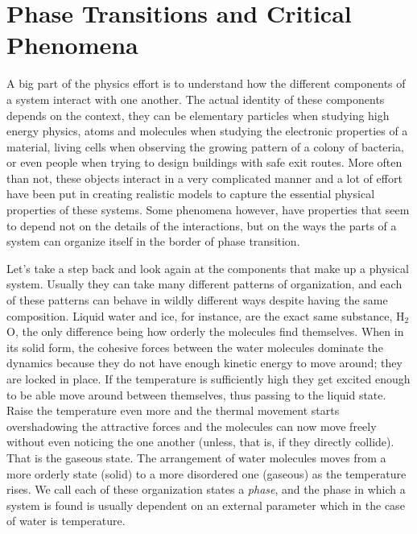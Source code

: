 \chapter{Phase Transitions and Critical Phenomena}
\label{ch2-crit}



A big part of the physics effort is to understand how the different components
of a system interact with one another. The actual identity of these components
depends on the context, they can be elementary particles when studying high
energy physics, atoms and molecules when studying the electronic properties of
a material, living cells when observing the growing pattern of a colony of
bacteria, or even people when trying to design buildings with safe exit routes.
More often than not, these objects interact in a very complicated manner and a
lot of effort have been put in creating realistic models to capture the
essential physical properties of these systems. Some phenomena however, have
properties that seem to depend not on the details of the interactions, but on
the ways the parts of a system can organize itself in the border of phase
transition.

Let's take a step back and look again at the components that make up a physical
system. Usually they can take many different patterns of organization, and each
of these patterns can behave in wildly different ways despite having the same
composition. Liquid water and ice, for instance, are the exact same substance,
H${}_2$O, the only difference being how orderly the molecules find themselves.
When in its solid form, the cohesive forces between the water molecules
dominate the dynamics because they do not have enough kinetic energy to move
around; they are locked in place. If the temperature is sufficiently high they
get excited enough to be able move around between themselves, thus passing to
the liquid state. Raise the temperature even more and the thermal movement
starts overshadowing the attractive forces and the molecules can now move
freely without even noticing the one another (unless, that is, if they directly
collide). That is the gaseous state. The arrangement of water molecules moves
from a more orderly state (solid) to a more disordered one (gaseous) as the
temperature rises. We call each of these organization states a \textit{phase},
and the phase in which a system is found is usually dependent on an external
parameter which in the case of water is temperature.

